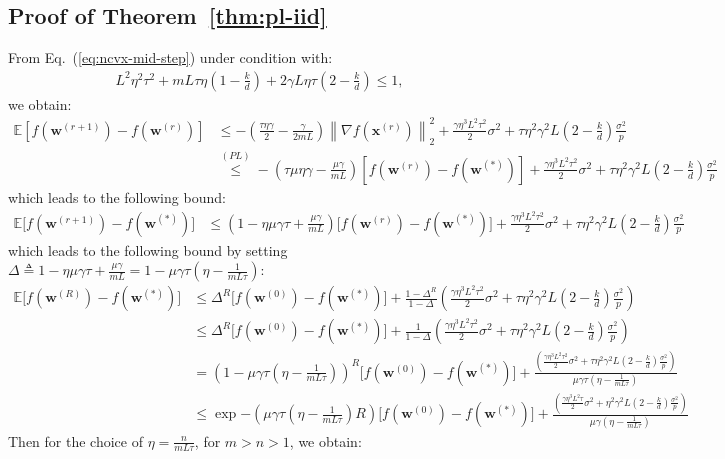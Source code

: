 \subsection{Proof of Theorem~\ref{thm:pl-iid}}
From Eq.~(\ref{eq:ncvx-mid-step}) under condition with:
\begin{align}
       L^2\eta^2\tau^2+mL\tau\eta\left(1-\frac{k}{d}\right)+2\gamma L\eta\tau\left(2-\frac{k}{d}\right)\leq 1, \label{eq:step_size_cnd_mmr}
\end{align}
we obtain:
\begin{align}
         \mathbb{E}\left[f({\boldsymbol{w}}^{(r+1)})-f({\boldsymbol{w}}^{(r)})\right]&\leq -\left(\frac{\tau\eta\gamma}{2}-\frac{\gamma}{2mL}\right)\left\|\nabla f({\boldsymbol{x}}^{(r)})\right\|_2^2+\frac{\gamma\eta^3L^2\tau^2}{2}\sigma^2+\tau\eta^2\gamma^2 L\left(2-\frac{k}{d}\right)\frac{\sigma^2}{p}\nonumber\\
         &\stackrel{(PL)}{\leq} -\left({\tau\mu\eta\gamma}-\frac{\mu\gamma}{mL}\right)\left[f({\boldsymbol{w}}^{(r)})-f({\boldsymbol{w}}^{(*)})\right]+\frac{\gamma\eta^3L^2\tau^2}{2}\sigma^2+\tau\eta^2\gamma^2 L\left(2-\frac{k}{d}\right)\frac{\sigma^2}{p} 
\end{align}
which leads to the following bound:
\begin{align}
            \mathbb{E}\Big[f({\boldsymbol{w}}^{(r+1)})-f({\boldsymbol{w}}^{(*)})\Big]&\leq \left(1-\eta\mu\gamma{\tau}+\frac{\mu\gamma}{mL}\right) \Big[f({\boldsymbol{w}}^{(r)})-f({\boldsymbol{w}}^{(*)})\Big]+\frac{\gamma\eta^3L^2\tau^2}{2}\sigma^2+\tau\eta^2\gamma^2 L\left(2-\frac{k}{d}\right)\frac{\sigma^2}{p} 
\end{align}
which leads to the following bound by setting $\Delta\triangleq1-\eta\mu\gamma{\tau}+\frac{\mu\gamma}{mL}=1-\mu\gamma\tau\left(\eta-\frac{1}{mL\tau}\right)$:
\begin{align}
            \mathbb{E}\Big[f({\boldsymbol{w}}^{(R)})-f({\boldsymbol{w}}^{(*)})\Big]&\leq \Delta^R \Big[f({\boldsymbol{w}}^{(0)})-f({\boldsymbol{w}}^{(*)})\Big]+\frac{1-\Delta^R}{1-\Delta}\left(\frac{\gamma\eta^3L^2\tau^2}{2}\sigma^2+\tau\eta^2\gamma^2 L\left(2-\frac{k}{d}\right)\frac{\sigma^2}{p} \right)\nonumber\\
            &\leq \Delta^R \Big[f({\boldsymbol{w}}^{(0)})-f({\boldsymbol{w}}^{(*)})\Big]+\frac{1}{1-\Delta}\left(\frac{\gamma\eta^3L^2\tau^2}{2}\sigma^2+\tau\eta^2\gamma^2 L\left(2-\frac{k}{d}\right)\frac{\sigma^2}{p} \right)\nonumber\\
            &={\left(1-\mu\gamma\tau\left(\eta-\frac{1}{mL\tau}\right)\right)}^R \Big[f({\boldsymbol{w}}^{(0)})-f({\boldsymbol{w}}^{(*)})\Big]+\frac{\left(\frac{\gamma\eta^3L^2\tau^2}{2}\sigma^2+\tau\eta^2\gamma^2 L\left(2-\frac{k}{d}\right)\frac{\sigma^2}{p} \right)}{\mu\gamma\tau\left(\eta-\frac{1}{m L\tau}\right)}\nonumber\\
            &\leq \exp{-\left(\mu\gamma\tau\left(\eta-\frac{1}{m L\tau}\right)R\right)}\Big[f({\boldsymbol{w}}^{(0)})-f({\boldsymbol{w}}^{(*)})\Big]+\frac{\left(\frac{\gamma\eta^3L^2\tau}{2}\sigma^2+\eta^2\gamma^2 L\left(2-\frac{k}{d}\right)\frac{\sigma^2}{p} \right)}{\mu\gamma\left(\eta-\frac{1}{mL\tau}\right)}
\end{align}
Then for the choice of $\eta=\frac{n}{mL\tau}$, for $m>n>1$, we obtain:


